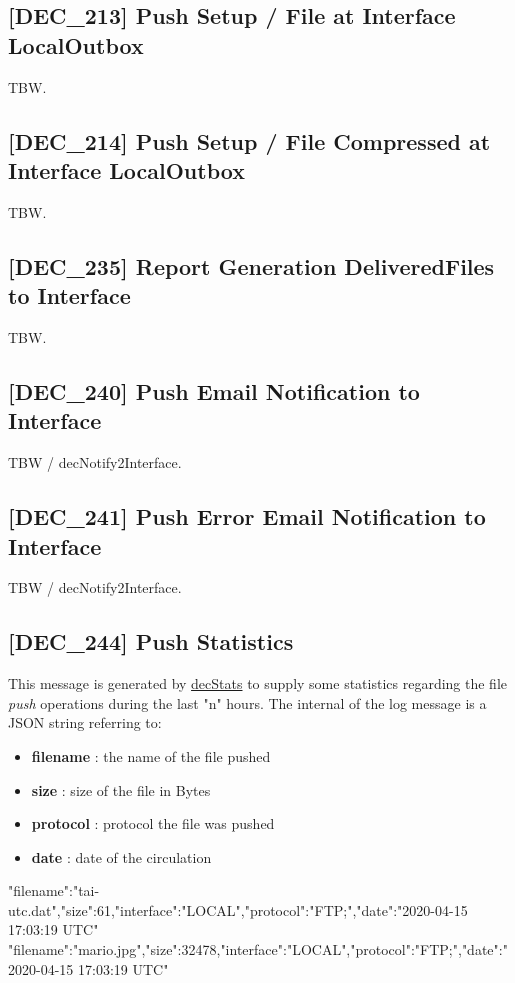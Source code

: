 \documentclass[dec_sum_main.tex]{subfiles}
\begin{document}
\subsection{[DEC\_213] Push Setup / File at Interface LocalOutbox}
TBW.

\label{DEC214}
\subsection{[DEC\_214] Push Setup / File Compressed at Interface LocalOutbox}
TBW.

\label{DEC235}
\subsection{[DEC\_235] Report Generation DeliveredFiles to Interface}
TBW.

\label{DEC240}
\subsection{[DEC\_240] Push Email Notification to Interface}
TBW / decNotify2Interface.

\label{DEC241}
\subsection{[DEC\_241] Push Error Email Notification to Interface}
TBW / decNotify2Interface.

\label{DEC244}
\subsection{[DEC\_244] Push Statistics}
This message is generated by \hyperref[decStats]{decStats} to supply some statistics regarding the file \textit{push} operations during the last "n" hours.\newline
The internal of the log message is a JSON string referring to:
\begin{itemize}
	\item \textbf{filename} : the name of the file pushed
	\item \textbf{size} : size of the file in Bytes
	\item \textbf{protocol} : protocol the file was pushed
	\item \textbf{date} : date of the circulation
\end{itemize}
\begin{verbnobox}[\fontsize{8pt}{8pt}\selectfont]
{"filename":"tai-utc.dat","size":61,"interface":"LOCAL","protocol":"FTP;","date":"2020-04-15 17:03:19 UTC"}
{"filename":"mario.jpg","size":32478,"interface":"LOCAL","protocol":"FTP;","date":"2020-04-15 17:03:19 UTC"}
\end{verbnobox}
\end{document}
